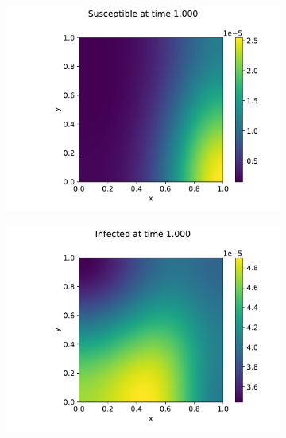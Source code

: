 \begin{figure}
    \centering
    \begin{subfigure}[b]{0.49\linewidth}
        \centering
        \includegraphics[width=\textwidth]{report/Images/plots/plot-i_t=10000-0.pdf}
    \end{subfigure}
    \hfill
    \begin{subfigure}[b]{0.49\linewidth}
        \centering
        \includegraphics[width=\textwidth]{report/Images/plots/plot-i_t=10000-1.pdf}
    \end{subfigure}
    \hfill
    \begin{subfigure}[b]{0.49\linewidth}
        \centering

\end{subfigure}
\end{figure}
